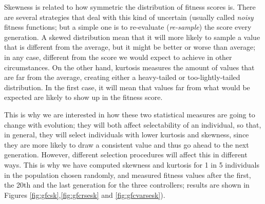 \documentclass[10pt,journal,compsoc]{IEEEtran}
\begin{document}
Skewness is related to how symmetric the distribution of fitness
scores is. There are several strategies that deal with this kind of
uncertain (usually called {\em noisy} fitness functions; but a simple
one is to re-evaluate ({\em re-sample}) the score every generation. A
skewed distribution mean that it will more likely to sample a value
that is different from the average, but it might be better or worse
than average; in any case, different from the score we would expect to
achieve in other circumstances. On the other hand, kurtosis measures
the amount of values that are far from the average, creating either a
heavy-tailed or too-lightly-tailed distribution. In the first case, it
will mean that values far from what would be expected are likely to
show up in the fitness score.

This is why we are interested in how these two statistical measures
are going to change with evolution; they will both affect
selectability of an individual, so that, in general, they will select
individuals with lower kurtosis and skewness, since they are more
likely to draw a consistent value and thus go ahead to the next
generation. However, different selection procedures will affect this
in different ways. This is why we have computed skewness and kurtosis for 1 in 5 individuals in the
population chosen randomly, and measured fitness values after the
first, the 20th and the last generation for the three controllers;
results are shown in Figures \ref{fig:gfcsk},\ref{fig:gfcrsesk} and
\ref{fig:gfcvarsesk}). %
\end{document}
